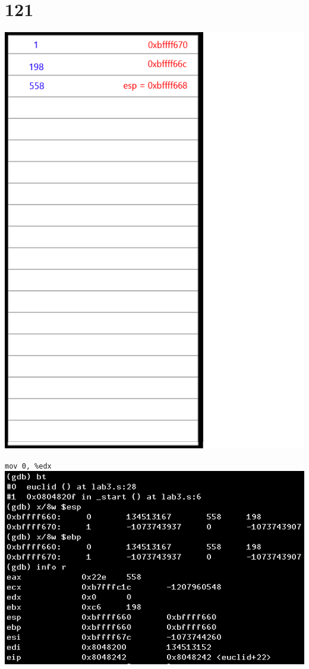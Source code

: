 \documentclass{article}
\begin{document}
\section*{121}
\begin{minipage}{5cm}
\includegraphics[scale=0.3]{s3.png}
\end{minipage}
\begin{minipage}{8cm}
\verb|mov 0, %edx|\\
\includegraphics[scale=0.4]{bxi12.png} \\
\end{minipage}
\clearpage
\end{document}
